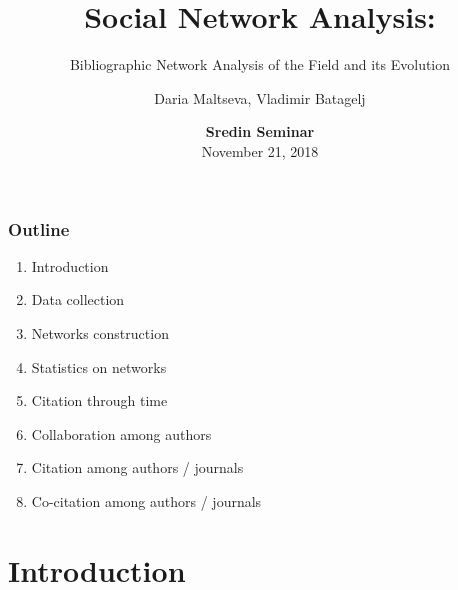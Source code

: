 \documentclass[hyperref={pdfstartview={FitBH -32768},
                         pdfpagemode=FullScreen,
                         plainpages=false,
                         colorlinks=true}
              ]{beamer}
\title[SNA. Bibliographic Network Analysis]{\textbf{Social Network Analysis:}}\subtitle{Bibliographic Network Analysis of the Field and its Evolution}
\author[D. Maltseva, V. Batagelj]{Daria Maltseva, Vladimir Batagelj}
\institute[IMFM \& IAM UP]{IMFM Ljubljana, IAM UP Koper and NRU HSE Moscow }
\date[November 21, 2018]{\small
\textcolor{BrickRed}{\textbf{Sredin Seminar}} \\
November 21, 2018}
\newcommand{\clock}{\count254=\time \divide\count254 by 60
 \count255=\count254 \multiply\count255 by -60
 \advance\count255 by \time
 \ifnum\count254<10 0\fi\number\count254\,:\,%
 \ifnum\count255<10 0\fi\number\count255}
\begin{document}

\frame{\maketitle}

\begin{frame}
\frametitle{Outline}
\small
\begin{enumerate}
\item Introduction 
\item Data collection 
\item Networks construction 
\item Statistics on networks
\item Citation through time
\item Collaboration among authors
\item Citation among authors / journals
\item Co-citation among authors / journals
\end{enumerate}




\end{frame}

\section{Introduction}
\end{document}
